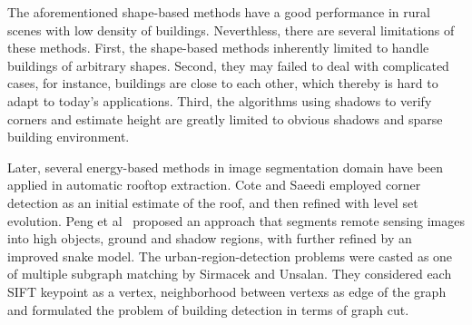 The aforementioned shape-based methods have a good performance in rural scenes with low density of buildings. 
Neverthless, there are several limitations of these methods.
First, the shape-based methods inherently limited to handle buildings of arbitrary shapes.
Second, they may failed to deal with complicated cases, for instance, buildings are close to each other, which thereby is hard to adapt to today's applications. 
Third, the algorithms using shadows to verify corners and estimate height are greatly limited to obvious shadows and sparse building environment.


Later, several energy-based methods in image segmentation domain have been applied in automatic rooftop extraction. 
Cote and Saeedi\cite{IEEEexample:cote2013automatic} employed corner detection as an initial estimate of the roof, and then refined with level set evolution. 
Peng et al~\cite{IEEEexample:peng2005improved} proposed an approach that segments remote sensing images into high objects, ground and shadow regions, with further refined by an improved snake model. 
The urban-region-detection problems were casted as one of multiple subgraph matching by Sirmacek and Unsalan\cite{IEEEexample:sirmacek2009urban}. 
They considered each SIFT keypoint as a vertex, neighborhood between vertexs as edge of the graph and formulated the problem of building detection in terms of graph cut.


